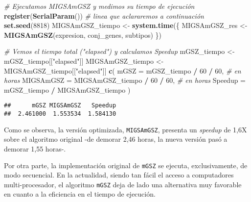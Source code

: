 \documentclass[12pt,twoside]{reedthesis}
\newenvironment{Shaded}{\begin{snugshade}}{\end{snugshade}}
\newcommand{\CommentTok}[1]{\textcolor[rgb]{0.56,0.35,0.01}{\textit{#1}}}
\newcommand{\DataTypeTok}[1]{\textcolor[rgb]{0.13,0.29,0.53}{#1}}
\newcommand{\DecValTok}[1]{\textcolor[rgb]{0.00,0.00,0.81}{#1}}
\newcommand{\KeywordTok}[1]{\textcolor[rgb]{0.13,0.29,0.53}{\textbf{#1}}}
\newcommand{\NormalTok}[1]{#1}
\newcommand{\OperatorTok}[1]{\textcolor[rgb]{0.81,0.36,0.00}{\textbf{#1}}}
\newcommand{\StringTok}[1]{\textcolor[rgb]{0.31,0.60,0.02}{#1}}
\begin{document}
\begin{Shaded}
\begin{Highlighting}[]
\CommentTok{# Ejecutamos MIGSAmGSZ y medimos su tiempo de ejecución}
\KeywordTok{register}\NormalTok{(}\KeywordTok{SerialParam}\NormalTok{()) }\CommentTok{# linea que aclararemos a continuación}
\KeywordTok{set.seed}\NormalTok{(}\DecValTok{8818}\NormalTok{)}
\NormalTok{MIGSAmGSZ_tiempo <-}\StringTok{ }\KeywordTok{system.time}\NormalTok{(\{}
\NormalTok{  MIGSAmGSZ_res <-}\StringTok{ }\KeywordTok{MIGSAmGSZ}\NormalTok{(expresion, conj_genes, subtipos)}
\NormalTok{\})}
\end{Highlighting}
\end{Shaded}
\begin{Shaded}
\begin{Highlighting}[]
\CommentTok{# Vemos el tiempo total ("elapsed") y calculamos Speedup}
\NormalTok{mGSZ_tiempo <-}\StringTok{ }\NormalTok{mGSZ_tiempo[[}\StringTok{"elapsed"}\NormalTok{]]}
\NormalTok{MIGSAmGSZ_tiempo <-}\StringTok{ }\NormalTok{MIGSAmGSZ_tiempo[[}\StringTok{"elapsed"}\NormalTok{]]}
\KeywordTok{c}\NormalTok{(}
  \DataTypeTok{mGSZ =}\NormalTok{ mGSZ_tiempo }\OperatorTok{/}\StringTok{ }\DecValTok{60} \OperatorTok{/}\StringTok{ }\DecValTok{60}\NormalTok{,            }\CommentTok{# en horas}
  \DataTypeTok{MIGSAmGSZ =}\NormalTok{ MIGSAmGSZ_tiempo }\OperatorTok{/}\StringTok{ }\DecValTok{60} \OperatorTok{/}\StringTok{ }\DecValTok{60}\NormalTok{,  }\CommentTok{# en horas}
  \DataTypeTok{Speedup =}\NormalTok{ mGSZ_tiempo }\OperatorTok{/}\StringTok{ }\NormalTok{MIGSAmGSZ_tiempo}
\NormalTok{)}
\end{Highlighting}
\end{Shaded}
\begin{verbatim}
##      mGSZ MIGSAmGSZ   Speedup 
##  2.461000  1.553534  1.584130
\end{verbatim}
Como se observa, la versión optimizada, \texttt{MIGSAmGSZ}, presenta un \emph{speedup} de 1,6X sobre el algoritmo original -de demorar 2,46 horas, la nueva versión pasó a demorar 1,55 horas-.

\par

Por otra parte, la implementación original de \texttt{mGSZ} se ejecuta, exclusivamente, de modo secuencial. En la actualidad, siendo tan fácil el acceso a computadores multi-procesador, el algoritmo \texttt{mGSZ} deja de lado una alternativa muy favorable en cuanto a la eficiencia en el tiempo de ejecución.

\par
\end{document}

